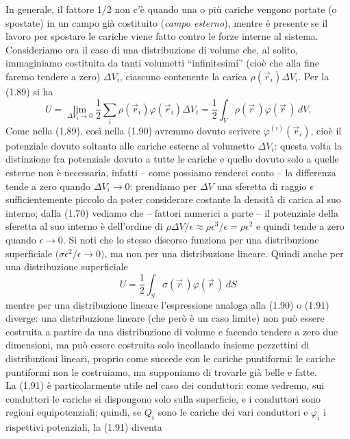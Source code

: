 In generale, il fattore 1/2 non c'è quando una o più cariche vengono portate (o spostate) in un campo già costituito (\emph{campo esterno}), mentre è presente se il lavoro per spostare le cariche viene fatto contro le forze interne al sistema.\\
Consideriamo ora il caso di una distribuzione di volume che, al solito, immaginiamo costituita da tanti volumetti ``infinitesimi'' (cioè che alla fine faremo tendere a zero) $\Delta V_i$, ciascuno contenente la carica $\rho(\vec r_i)\Delta V_i$. Per la (1.89) si ha
\begin{equation}
U=\lim_{\Delta V_i\to0}\frac12\sum_i\rho(\vec r_i)\varphi(\vec r_i)\Delta V_i=\frac12\int_V\rho(\vec r\,)\varphi(\vec r\,)\,dV.
\tag{1.90}
\end{equation}
Come nella (1.89), così nella (1.90) avremmo dovuto scrivere $\varphi^{(i)}(\vec r_i)$, cioè il potenziale dovuto soltanto alle cariche esterne al volumetto $\Delta V_i$: questa volta la distinzione fra potenziale dovuto a tutte le cariche e quello dovuto solo a quelle esterne non è necessaria, infatti -- come possiamo renderci conto -- la differenza tende a zero quando $\Delta V_i\to0$: prendiamo per $\Delta V$ una sferetta di raggio $\epsilon$ sufficientemente piccolo da poter considerare costante la densità di carica al suo interno; dalla (1.70) vediamo che -- fattori numerici a parte -- il potenziale della sferetta al suo interno è dell'ordine di $\rho\Delta V/\epsilon\approx\rho\epsilon^3/\epsilon=\rho\epsilon^2$ e quindi tende a zero quando $\epsilon\to0$. Si noti che lo stesso discorso funziona per una distribuzione superficiale $\big(\sigma\epsilon^2/\epsilon\to0\big)$, ma non per una distribuzione lineare. Quindi anche per una distribuzione superficiale
\begin{equation}
U=\frac12\int_S\sigma(\vec r\,)\varphi(\vec r\,)\,dS
\tag{1.91}
\end{equation}
mentre per una distribuzione lineare l'espressione analoga alla (1.90) o (1.91) diverge: una distribuzione lineare (che però è un caso limite) non può essere costruita a partire da una distribuzione di volume e facendo tendere a zero due dimensioni, ma può essere costruita solo incollando insieme pezzettini di distribuzioni lineari, proprio come succede con le cariche puntiformi: le cariche puntiformi non le costruiamo, ma supponiamo di trovarle già belle e fatte.\\
La (1.91) è particolarmente utile nel caso dei conduttori: come vedremo, sui conduttori le cariche si dispongono solo sulla superficie, e i conduttori sono regioni equipotenziali; quindi, se $Q_i$ sono le cariche dei vari conduttori e $\varphi_i$ i rispettivi potenziali, la (1.91) diventa
